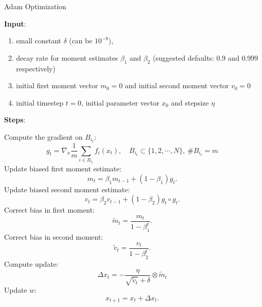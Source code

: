 \begin{algorithm}[H]
\caption{Adam Optimization}
\label{alg:Adam}
{\bf Input}: 
\begin{enumerate}
\item small constant $\delta$ (can be $10^{-8}$), 
\item decay rate for moment estimates $\beta_1$ and $\beta_2$ (suggested defaults: 0.9 and 0.999 respectively)
\item initial first moment vector $m_0=0$ and initial second moment vector $v_0=0$
\item initial timestep $t=0$, initial parameter vector $x_0$ and stepsize $\eta$
\end{enumerate}
{\bf Steps}: 

Compute the gradient on $B_{i_t}$:
\begin{equation}
g_t = \nabla_{x} \frac{1}{m} \sum_{i \in B_{i_t}} f_i(x_{t}),\quad B_{i_t} \subset \{1, 2, \cdots, N \},\ \#B_{i_t} =m
\end{equation}
Update biased first moment estimate:
\begin{equation}
m_t = \beta_1 m_{t-1} + (1-\beta_1)g_t.
\end{equation}
Update biased second moment estimate:
\begin{equation}
v_t = \beta_2 v_{t-1} + (1-\beta_2)g_t \circ g_t.
\end{equation}
Correct bias in first moment:
\begin{equation}
\tilde m_t = \frac{m_t}{1 - \beta_1^{t}}.
\end{equation}
Correct bias in second moment:
\begin{equation}
\tilde v_t = \frac{v_t}{1 - \beta_2^{t}}.
\end{equation}
Compute update:
\begin{equation}
\Delta x_t =  -\frac{\eta}{\sqrt{\tilde v_t} + \delta} \otimes \tilde m_t
\end{equation}
Update $w$:
\begin{equation}
x_{t+1} = x_t + \Delta x_t.
\end{equation}
\end{algorithm}
